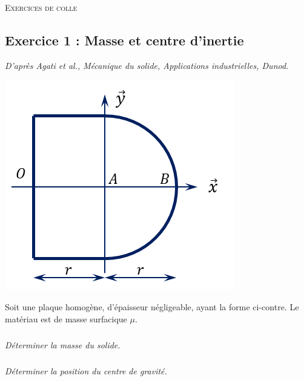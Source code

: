 \documentclass[10pt]{article}
\begin{document}

\begin{center}
\Large{\textsc{Exercices de colle}}
\end{center}

\vspace{.5cm}


\subsection*{Exercice 1 : Masse et centre d'inertie}
\begin{flushright}
\textit{D'après Agati et al., Mécanique du solide, Applications industrielles, Dunod.}
\end{flushright}
\setcounter{subparagraph}{0}

\begin{minipage}[c]{.3\linewidth}
\begin{center}
\includegraphics[width=.95\textwidth]{images/plaque}
\end{center}
\end{minipage}\hfill
\begin{minipage}[c]{.65\linewidth}
Soit une plaque homogène, d'épaisseur négligeable, ayant la forme ci-contre. Le matériau est de masse surfacique $\mu$.

\subparagraph{}
\textit{Déterminer la masse du solide.}

\subparagraph{}
\textit{Déterminer la position du centre de gravité.}


\end{minipage}
\end{document}

